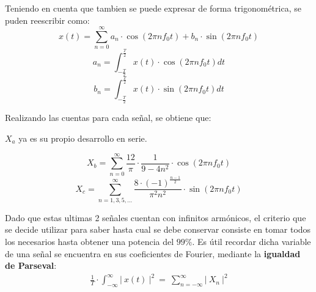 Teniendo en cuenta que tambien se puede expresar de forma trigonométrica, se puden reescribir como:
\begin{equation*}
x(t) = \sum_{n=0}^{\infty} a_n \cdot \cos(2\pi n f_0t) + b_n  \cdot \sin(2\pi n f_0t)
\end{equation*}
\begin{equation*}
a_n = \int_{-\frac{T}{2}}^\frac{T}{2} x(t) \cdot \cos(2\pi n f_0t) dt
\end{equation*}
\begin{equation*}
b_n = \int_{-\frac{T}{2}}^\frac{T}{2} x(t) \cdot \sin(2\pi n f_0t) dt 
\end{equation*}

Realizando las cuentas para cada señal, se obtiene que:
\begin{center}
$X_a$ ya es su propio desarrollo en serie.
\end{center}
\begin{equation*}
X_b = \sum_{n=0}^{\infty} \frac{12}{\pi} \cdot \frac{1}{9-4n^2} \cdot \cos(2\pi n f_0t)
\end{equation*}
\begin{equation*}
X_c = \sum_{n=1,3,5,...}^{\infty} \frac{8 \cdot (-1)^{\frac{n-1}{2}}}{\pi^2 n^2} \cdot \sin(2\pi n f_0t)
\end{equation*}

Dado que estas ultimas 2 señales cuentan con infinitos armónicos, el criterio que se decide utilizar para saber hasta cual se debe conservar consiste en tomar todos los necesarios hasta obtener una potencia del $99\%$. Es útil recordar dicha variable de una señal se encuentra en sus coeficientes de Fourier, mediante la \textbf{igualdad de Parseval}:
\begin{align}
\frac{1}{T} \cdot \int_{-\infty}^\infty |\ x(t)\ |^2 \ =\  \sum_{n=- \infty}^{\infty} |\ X_n \ |^2
\end{align}

